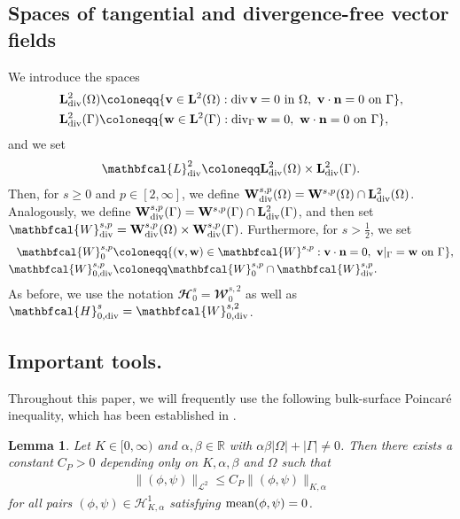 \documentclass[10pt,reqno]{amsart}
\newtheorem{lemma}[theorem]{Lemma}
\theoremstyle{remark}
\numberwithin{equation}{section}
\newcommand{\abs}[1]{| #1 |}
\newcommand{\norm}[1]{\| #1 \|}
\newcommand{\scp}[2]{ ( #1 , #2  )}
\newcommand{\mean}[2]{\textnormal{mean}\scp{#1}{#2}}
\newcommand{\R}{\mathbb R}
\newcommand{\n}{\mathbf{n}}
\newcommand{\bv}{\mathbf{v}}
\newcommand{\bw}{\mathbf{w}}
\newcommand{\Div}{\textnormal{div}}
\newcommand{\Divg}{\textnormal{div}_\Ga}
\newcommand{\Om}{\Omega}
\newcommand{\Ga}{\Gamma}
\begin{document}
\subsection{Spaces of tangential and divergence-free vector fields}

We introduce the spaces 
\begin{align*}
	&\mathbf{L}^2_\Div(\Om) \coloneqq \{ \bv\in\mathbf{L}^2(\Om): \Div\,\bv = 0 \ \text{in~}\Om, \ \bv\cdot\n = 0 \ \text{on~}\Ga\}, \\
	&\mathbf{L}^2_\Div(\Ga) \coloneqq \{ \bw\in\mathbf{L}^2(\Ga): \Divg\,\bw = 0, \ \bw\cdot\n = 0 \ \text{on~}\Ga\},
\end{align*}
and we set
\begin{align*}
    \mathbfcal{L}^2_\Div \coloneqq \mathbf{L}^2_\Div(\Om)\times\mathbf{L}^2_\Div(\Ga).
\end{align*}
Then, for $s\geq 0$ and $p\in[2,\infty]$, we define $\mathbf{W}^{s,p}_\Div(\Om) = \mathbf{W}^{s,p}(\Om)\cap \mathbf{L}^2_\Div(\Om)$. Analogously, we define $\mathbf{W}^{s,p}_\Div(\Ga) = \mathbf{W}^{s,p}(\Ga)\cap \mathbf{L}^2_\Div(\Ga)$, and then set $\mathbfcal{W}^{s,p}_\Div = \mathbf{W}^{s,p}_\Div(\Om)\times\mathbf{W}^{s,p}_\Div(\Ga)$. Furthermore, for $s>\frac 12$, we set 
\begin{align*}
    \mathbfcal{W}^{s,p}_0 &\coloneqq \{(\bv,\bw)\in\mathbfcal{W}^{s,p}: \bv\cdot\n = 0, \ \bv\vert_\Ga = \bw \ \text{on~}\Ga\},
    \\
    \mathbfcal{W}^{s,p}_{0,\Div} &\coloneqq \mathbfcal{W}^{s,p}_0 \cap \mathbfcal{W}^{s,p}_\Div.
\end{align*}
As before, we use the notation $\mathbfcal{H}^s_0 = \mathbfcal{W}^{s,2}_0$ as well as $\mathbfcal{H}^s_{0,\Div} = \mathbfcal{W}^{s,2}_{0,\Div}$.


\medskip
\subsection{Important tools.}

Throughout this paper, we will frequently use the following bulk-surface Poincar\'{e} inequality, which has been established in \cite[Lemma~A.1]{Knopf2021}.

\begin{lemma}\label{Lemma:Poincare}
	Let $K\in[0,\infty)$ and $\alpha,\beta\in\R$ with $\alpha\beta\abs{\Om} + \abs{\Ga} \neq 0$. Then there exists a constant $C_P > 0$ depending only on $K,\alpha,\beta$ and $\Om$ such that
	\begin{align}\label{Est:Poincare}
		\norm{(\phi,\psi)}_{\mathcal{L}^2} \leq C_P \norm{(\phi,\psi)}_{K,\alpha}
	\end{align}
	for all pairs $(\phi,\psi)\in\mathcal{H}^1_{K,\alpha}$ satisfying $\mean{\phi}{\psi} = 0$.
\end{lemma}
\end{document}

